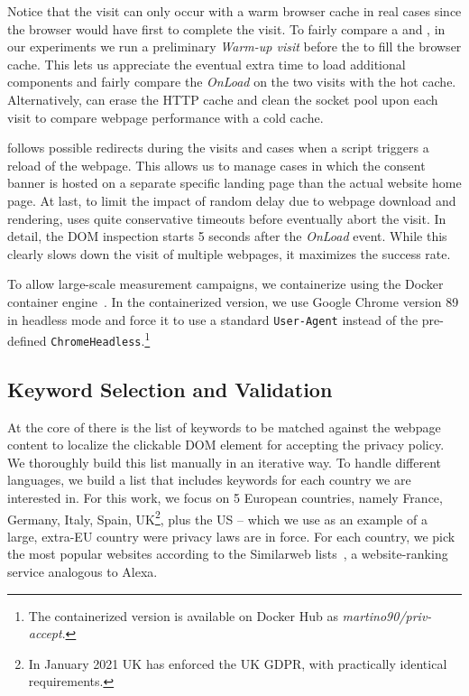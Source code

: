 Notice that the \AFTER visit can only occur with a warm browser cache in real cases since the browser would have first to complete the \BEFORE visit.
To fairly compare a \BEFORE and \AFTER, in our experiments we run a preliminary \emph{Warm-up visit} before the \BEFORE to fill the browser cache. This lets us appreciate the eventual extra time to load additional components and fairly compare the \emph{OnLoad} on the two visits with the hot cache. Alternatively, \TOOL can erase the HTTP cache and clean the socket pool upon each visit to compare webpage performance with a cold cache. 

\TOOL follows possible redirects during the visits and cases when a script triggers a reload of the webpage. This allows us to manage cases in which the consent banner is hosted on a separate specific landing page than the actual website home page. At last, to limit the impact of random delay due to webpage download and rendering, \TOOL uses quite conservative timeouts before eventually abort the visit. In detail, the DOM inspection starts 5 seconds after the \emph{OnLoad} event. While this clearly slows down the visit of multiple webpages, it maximizes the success rate.

To allow large-scale measurement campaigns, we containerize \TOOL using the Docker container engine~\cite{docker}. In the containerized version, we use Google Chrome version 89 in headless mode and force it to use a standard \texttt{User-Agent} instead of the pre-defined \texttt{ChromeHeadless}.\footnote{The containerized version is available on Docker Hub as \emph{martino90/priv-accept}.}

\subsection{Keyword Selection and Validation}
\label{sec:keywords}

At the core of \TOOL there is the list of keywords to be matched against the webpage content to localize the clickable DOM element for accepting the privacy policy. We thoroughly build this list manually in an iterative way. To handle different languages, we build a list that includes keywords for each country we are interested in. For this work, we focus on 5 European countries, namely France, Germany, Italy, Spain, UK\footnote{In January 2021 UK has enforced the UK GDPR, with practically identical requirements.}, plus the US -- which we use as an example of a large, extra-EU country were privacy laws are in force. For each country, we pick the most popular websites according to the Similarweb lists~\cite{similarweb}, a website-ranking service analogous to Alexa.

